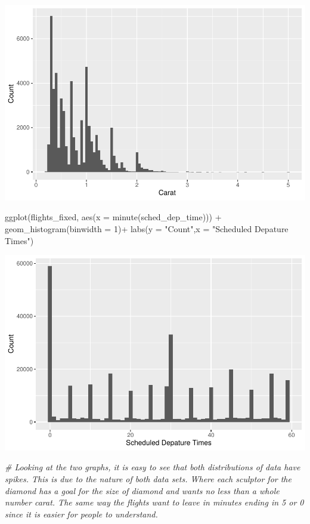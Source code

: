 \documentclass[
]{article}
\newenvironment{Shaded}{\begin{snugshade}}{\end{snugshade}}
\newcommand{\AttributeTok}[1]{\textcolor[rgb]{0.77,0.63,0.00}{#1}}
\newcommand{\CommentTok}[1]{\textcolor[rgb]{0.56,0.35,0.01}{\textit{#1}}}
\newcommand{\DecValTok}[1]{\textcolor[rgb]{0.00,0.00,0.81}{#1}}
\newcommand{\FunctionTok}[1]{\textcolor[rgb]{0.00,0.00,0.00}{#1}}
\newcommand{\NormalTok}[1]{#1}
\newcommand{\SpecialCharTok}[1]{\textcolor[rgb]{0.00,0.00,0.00}{#1}}
\newcommand{\StringTok}[1]{\textcolor[rgb]{0.31,0.60,0.02}{#1}}
\begin{document}
\includegraphics{MidtermPR_files/figure-latex/unnamed-chunk-8-1.pdf}

\begin{Shaded}
\begin{Highlighting}[]
\FunctionTok{ggplot}\NormalTok{(flights\_fixed, }\FunctionTok{aes}\NormalTok{(}\AttributeTok{x =} \FunctionTok{minute}\NormalTok{(sched\_dep\_time))) }\SpecialCharTok{+}
  \FunctionTok{geom\_histogram}\NormalTok{(}\AttributeTok{binwidth =} \DecValTok{1}\NormalTok{)}\SpecialCharTok{+}
  \FunctionTok{labs}\NormalTok{(}\AttributeTok{y =} \StringTok{"Count"}\NormalTok{,}\AttributeTok{x =} \StringTok{"Scheduled Depature Times"}\NormalTok{)}
\end{Highlighting}
\end{Shaded}

\includegraphics{MidtermPR_files/figure-latex/unnamed-chunk-8-2.pdf}

\begin{Shaded}
\begin{Highlighting}[]
\CommentTok{\# Looking at the two graphs, it is easy to see that both distributions of data have spikes. This is due to the nature of both data sets. Where each sculptor for the diamond has a goal for the size of diamond and wants no less than a whole number carat. The same way the flights want to leave in minutes ending in 5 or 0 since it is easier for people to understand.}
\end{Highlighting}
\end{Shaded}
\end{document}
